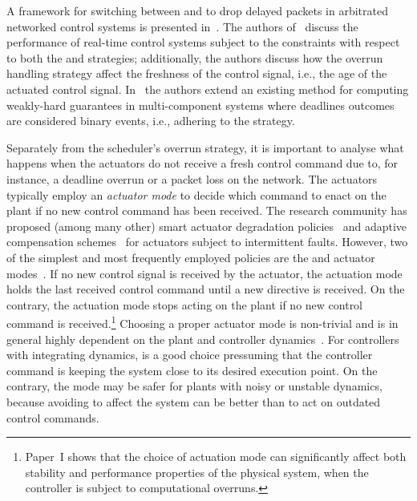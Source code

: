%
A framework for switching between \tK{} and \tS{} to drop delayed packets in arbitrated networked control systems is presented in~\cite{Soudbakhsh:2018}.
The authors of~\cite{Pazzaglia:2018} discuss the performance of real-time control systems subject to the \tAM{} constraints with respect to both the \tK{} and \tS{} strategies; additionally, the authors discuss how the overrun handling strategy affect the freshness of the control signal, i.e., the age of the actuated control signal.
In~\cite{Ernst:2019} the authors extend an existing method for computing weakly-hard guarantees in multi-component systems where deadlines outcomes are considered binary events, i.e., adhering to the \tK{} strategy.

Separately from the scheduler's overrun strategy, it is important to analyse what happens when the actuators do not receive a fresh control command due to, for instance, a deadline overrun or a packet loss on the network.
The actuators typically employ an \emph{actuator mode} to decide which command to enact on the plant if no new control command has been received.
The research community has proposed (among many other) smart actuator degradation policies~\cite{Ma:2018} and adaptive compensation schemes~\cite{Xing:2017} for actuators subject to intermittent faults.
However, two of the simplest and most frequently employed policies are the \tZ{} and \tH{} actuator modes~\cite{Schenato:2009}.
If no new control signal is received by the actuator, the \tH{} actuation mode holds the last received control command until a new directive is received.
On the contrary, the \tZ{} actuation mode stops acting on the plant if no new control command is received.\footnote{Paper~I shows that the choice of actuation mode can significantly affect both stability and performance properties of the physical system, when the controller is subject to computational overruns.}
Choosing a proper actuator mode is non-trivial and is in general highly dependent on the plant and controller dynamics~\cite{Schenato:2009}.
For controllers with integrating dynamics, \tH{} is a good choice pressuming that the controller command is keeping the system close to its desired execution point.
On the contrary, the \tZ{} mode may be safer for plants with noisy or unstable dynamics, because avoiding to affect the system can be better than to act on outdated control commands.



